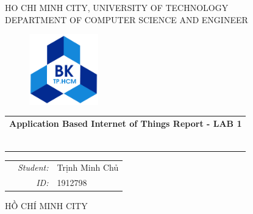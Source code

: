 \documentclass[a4paper,11pt]{article}
\theoremstyle{mytheor}
\begin{document}
\begin{titlepage}
\begin{center}
HO CHI MINH CITY, UNIVERSITY OF TECHNOLOGY \\
DEPARTMENT OF COMPUTER SCIENCE AND ENGINEER
\end{center}

\vspace{1cm}

\begin{figure}[h!]
\begin{center}
\includegraphics[width=3cm]{hcmut.png}
\end{center}
\end{figure}

\vspace{2cm}


\begin{center}
\begin{tabular}{c}
\multicolumn{1}{c}{\textbf{{\Large Application Based Internet of Things Report - LAB 1}}}



~~\\

\\
\multicolumn{1}{l}{\textbf{{\Large}}}\\
\\
\textbf{{\Large}}\\

\\
\\

\end{tabular}
\end{center}

\vspace{3cm}

\begin{table}[h]
\begin{tabular}{rrl}
\hspace{5.1cm} 
&\textit{Student: } & Trịnh Minh Chủ\\
&\textit{ID: } & 1912798 \\

\end{tabular}
\end{table}
\vspace{3cm}
\begin{center}
{\footnotesize HỒ CHÍ MINH CITY}
\end{center}
\end{titlepage}
\end{document}
